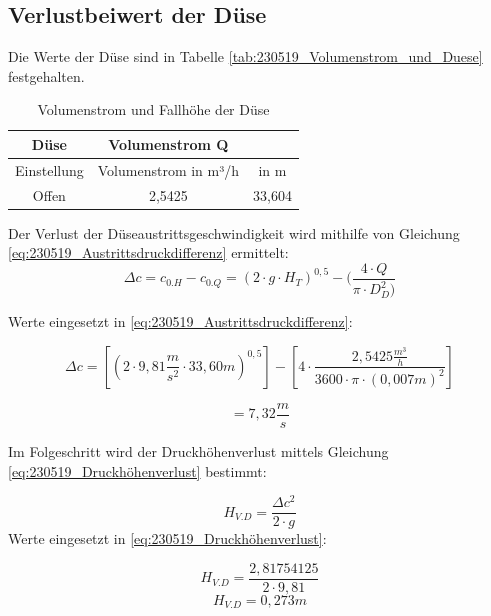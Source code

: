 \subsection{Verlustbeiwert der Düse}

Die Werte der Düse sind in Tabelle \autoref{tab:230519_Volumenstrom_und_Duese} festgehalten.

\begin{table}[!ht]
\centering
\caption{Volumenstrom und Fallhöhe der Düse}
\label{tab:230519_Volumenstrom_und_Duese}
\begin{tabular}{|c|c|c|}
\hline
\rowcolor[HTML]{70AD47} 
{\color[HTML]{FFFFFF} Düse}         & {\color[HTML]{FFFFFF} Volumenstrom Q}          & \cellcolor[HTML]{70AD47}{\color[HTML]{FFFFFF}Fallhöhe $H_{T}$ }\\ \hline
\cellcolor[HTML]{A9D08E}Einstellung & \cellcolor[HTML]{5B9BD5}Volumenstrom   in m³/h & \cellcolor[HTML]{5B9BD5}in m              \\ \hline
\rowcolor[HTML]{DDEBF7} 
\cellcolor[HTML]{CFE5A8}Offen       & 2,5425                                         & 33,604                                    \\ \hline
\end{tabular}
\end{table}

Der Verlust der Düseaustrittsgeschwindigkeit wird mithilfe von Gleichung \autoref{eq:230519_Austrittsdruckdifferenz} ermittelt:
\begin{equation}
\Delta c = c_{0.H} - c_{0.Q} = ( 2\cdot g \cdot H_T)^{0,5} - (\frac{4\cdot Q}{\pi \cdot D_D^2)}
\label{eq:230519_Austrittsdruckdifferenz}
\end{equation}

Werte eingesetzt in \autoref{eq:230519_Austrittsdruckdifferenz}:

$$\Delta c =[( 2\cdot 9,81 \frac{m}{s^2} \cdot 33,60m
)^{0,5}] -[ 4\cdot \frac{2,5425\frac{m^3}{h}}{3600\cdot \pi \cdot (0,007m)^2}] $$

$$ =7,32 \frac{m}{s}$$

Im Folgeschritt wird der Druckhöhenverlust mittels Gleichung \autoref{eq:230519_Druckhöhenverlust} bestimmt:

\begin{equation}
H_{V.D} = \frac{\Delta c^2}{2\cdot g}
\label{eq:230519_Druckhöhenverlust}
\end{equation}
Werte eingesetzt in \autoref{eq:230519_Druckhöhenverlust}:

$$ H_{V.D} = \frac{2,81754125}{2\cdot 9,81} $$
$$ H_{V.D} = 0,273m $$

